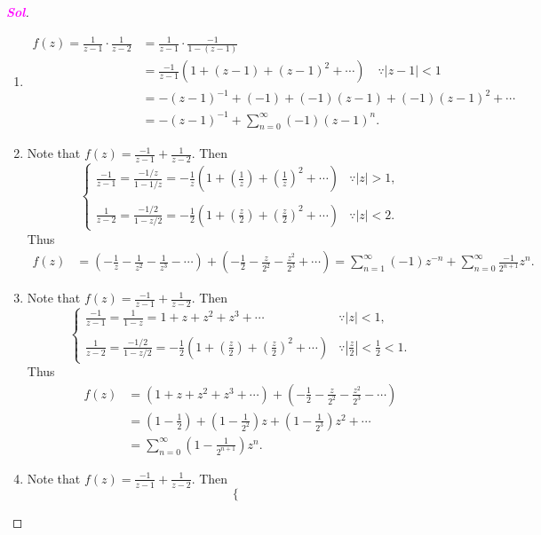 \documentclass{article}
\theoremstyle{definition}
\newcommand{\of}[1]{\left( #1 \right)}
\newcommand{\abs}[1]{\left\lvert #1 \right\rvert}
\newcommand{\sol}{\textcolor{magenta}{\bf Sol}}
\begin{document}
	\begin{proof}[\sol]
		\begin{enumerate}[(1)]
			\item \begin{align*}
			f(z)=\frac{1}{z-1}\cdot\frac{1}{z-2}&=\frac{1}{z-1}\cdot\frac{-1}{1-(z-1)}\\
			&=\frac{-1}{z-1}\of{1+(z-1)+(z-1)^2+\cdots}\quad\because\abs{z-1}<1\\
			&=-(z-1)^{-1}+(-1)+(-1)(z-1)+(-1)(z-1)^2+\cdots\\
			&=-(z-1)^{-1}+\sum_{n=0}^\infty(-1)(z-1)^n.
			\end{align*}
			\item Note that $\displaystyle f(z)=\frac{-1}{z-1}+\frac{1}{z-2}$. Then \[
			\begin{cases}
			\frac{-1}{z-1}=\frac{-1/z}{1-1/z}=-\frac{1}{z}\of{1+\of{\frac{1}{z}}+\of{\frac{1}{z}}^2+\cdots} &\because\abs{z}>1,\\
			\\
			\frac{1}{z-2}=\frac{-1/2}{1-z/2}=-\frac{1}{2}\of{1+\of{\frac{z}{2}}+\of{\frac{z}{2}}^2+\cdots} &\because\abs{z}<2.
			\end{cases}
			\] Thus \begin{align*}
			f(z)&=\of{-\frac{1}{z}-\frac{1}{z^2}-\frac{1}{z^3}-\cdots}+\of{-\frac{1}{2}-\frac{z}{2^2}-\frac{z^2}{2^3}+\cdots}=\sum_{n=1}^\infty(-1)z^{-n}+\sum_{n=0}^\infty\frac{-1}{2^{n+1}}z^n.
			\end{align*}
			\item Note that $\displaystyle f(z)=\frac{-1}{z-1}+\frac{1}{z-2}$. Then \[
			\begin{cases}
			\frac{-1}{z-1}=\frac{1}{1-z}=1+z+z^2+z^3+\cdots &\because\abs{z}<1,\\
			\\
			\frac{1}{z-2}=\frac{-1/2}{1-z/2}=-\frac{1}{2}\of{1+\of{\frac{z}{2}}+\of{\frac{z}{2}}^2+\cdots} &\because\abs{\frac{z}{2}}<\frac{1}{2}<1.
			\end{cases}
			\] Thus \begin{align*}
			f(z)&=\of{1+z+z^2+z^3+\cdots}+\of{-\frac{1}{2}-\frac{z}{2^2}-\frac{z^2}{2^3}-\cdots}\\
			&=\of{1-\frac{1}{2}}+\of{1-\frac{1}{2^2}}z+\of{1-\frac{1}{2^3}}z^2+\cdots\\
			&=\sum_{n=0}^\infty\of{1-\frac{1}{2^{n+1}}}z^n.
			\end{align*}
			\item Note that $\displaystyle f(z)=\frac{-1}{z-1}+\frac{1}{z-2}$. Then \[
			\begin{cases}

\end{cases}\]
\end{enumerate}
\end{proof}
\end{document}
